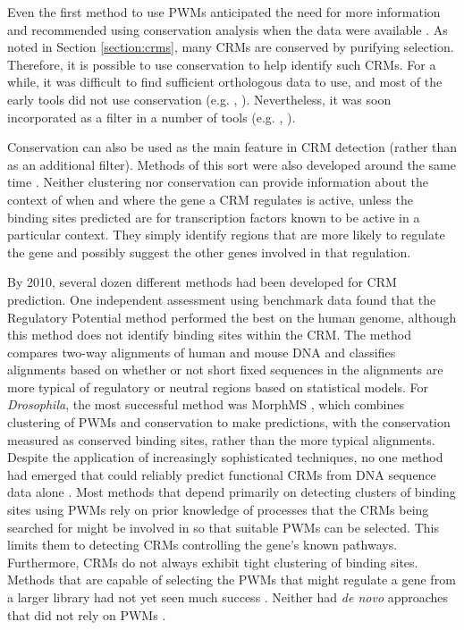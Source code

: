 \documentclass{frontiersENG} %
\begin{document}
Even the first method to use PWMs anticipated the need for more
information and recommended using conservation analysis when the data
were available \cite{Wasserman1998}. As noted in Section
\ref{section:crms}, many CRMs are conserved by purifying
selection. Therefore, it is possible to use conservation to help
identify such CRMs. For a while, it was difficult to find sufficient
orthologous data to use, and most of the early tools did not use
conservation (e.g. \cite{Sinha2003}, \cite{Frith2003}). Nevertheless,
it was soon incorporated as a filter in a number of tools
(e.g. \cite{Sinha2004}, \cite{Sinha2007}).

Conservation can also be used as the main feature in CRM detection
(rather than as an additional filter). Methods of this sort were also
developed around the same time \cite{Kolbe2004}. Neither clustering
nor conservation can provide information about the context of when and
where the gene a CRM regulates is active, unless the binding sites
predicted are for transcription factors known to be active in a
particular context. They simply identify regions that are more likely
to regulate the gene and possibly suggest the other genes involved in
that regulation.

By 2010, several dozen different methods had been developed for CRM
prediction. One independent assessment using benchmark data
\cite{Su2010} found that the Regulatory Potential method
\cite{Kolbe2004} performed the best on the human genome, although this
method does not identify binding sites within the CRM. The method
compares two-way alignments of human and mouse DNA and classifies
alignments based on whether or not short fixed sequences in the
alignments are more typical of regulatory or neutral regions based on
statistical models. For \textit{Drosophila}, the most successful
method was MorphMS \cite{Sinha2007}, which combines clustering of PWMs
and conservation to make predictions, with the conservation measured
as conserved binding sites, rather than the more typical
alignments. Despite the application of increasingly sophisticated
techniques, no one method had emerged that could reliably predict
functional CRMs from DNA sequence data alone \cite{Su2010}. Most
methods that depend primarily on detecting clusters of binding sites
using PWMs rely on prior knowledge of processes that the CRMs being
searched for might be involved in so that suitable PWMs can be
selected. This limits them to detecting CRMs controlling the gene's
known pathways. Furthermore, CRMs do not always exhibit tight
clustering of binding sites. Methods that are capable of selecting the
PWMs that might regulate a gene from a larger library had not yet seen
much success \cite{Loo2009}. Neither had \textit{de novo} approaches
that did not rely on PWMs \cite{Su2010}.
\end{document}
